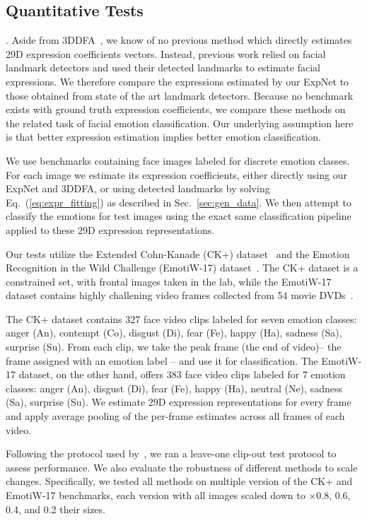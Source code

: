 \documentclass[a4paper, 10pt, conference]{ieeeconf}
\newcommand{\minisection}[1]{\vspace{2mm}\noindent{\bf #1}.}
\begin{document}
\subsection{Quantitative Tests}\label{sec:quant}
\minisection{Benchmark settings} Aside from 3DDFA~\cite{zhu2015}, we know of no previous method which directly estimates 29D expression coefficients vectors. Instead, previous work relied on facial landmark detectors and used their detected landmarks to estimate facial expressions. We therefore compare the expressions estimated by our ExpNet to those obtained from state of the art landmark detectors. Because no benchmark exists with ground truth expression coefficients, we compare these methods on the related task of facial emotion classification. Our underlying assumption here is that better expression estimation implies better emotion classification.  

We use benchmarks containing face images labeled for discrete emotion classes. For each image we estimate its expression coefficients, either directly using our ExpNet and 3DDFA, or using detected landmarks by solving Eq.~(\ref{eq:expr_fitting}) as described in Sec.~\ref{sec:gen_data}. We then attempt to classify the emotions for test images using the exact same classification pipeline applied to these 29D expression representations. 

Our tests utilize the Extended Cohn-Kanade (CK+) dataset~\cite{lucey2010extended} and the Emotion Recognition in the Wild Challenge (EmotiW-17) dataset~\cite{dhall2017individual}. The CK+ dataset is a constrained set, with frontal images taken in the lab, while the EmotiW-17 dataset contains highly challening video frames collected from 54 movie DVDs~\cite{dhall2012collecting}.

The CK+ dataset contains 327 face video clips labeled for seven emotion classes:
anger (An), contempt (Co), disgust (Di), fear (Fe), happy (Ha), sadness (Sa), surprise (Su). From each clip, we take the peak frame (the end of video)– the frame assigned with an emotion label – and use it for classification. The EmotiW-17 dataset, on the other hand, offers 383 face video clips labeled for 7 emotion classes: anger (An), disgust (Di), fear (Fe), happy (Ha), neutral (Ne), sadness (Sa), surprise (Su).  We estimate 29D expression representations for every frame and apply average pooling of the per-frame estimates across all frames of each video. 

Following the protocol used by~\cite{lucey2010extended}, we ran a leave-one clip-out test protocol to assess performance. We also evaluate the robustness of different methods to scale changes. Specifically, we tested all methods on multiple version of the CK+ and EmotiW-17 benchmarks, each version with all images scaled down to $\times$0.8, 0.6, 0.4, and 0.2 their sizes.
\end{document}
